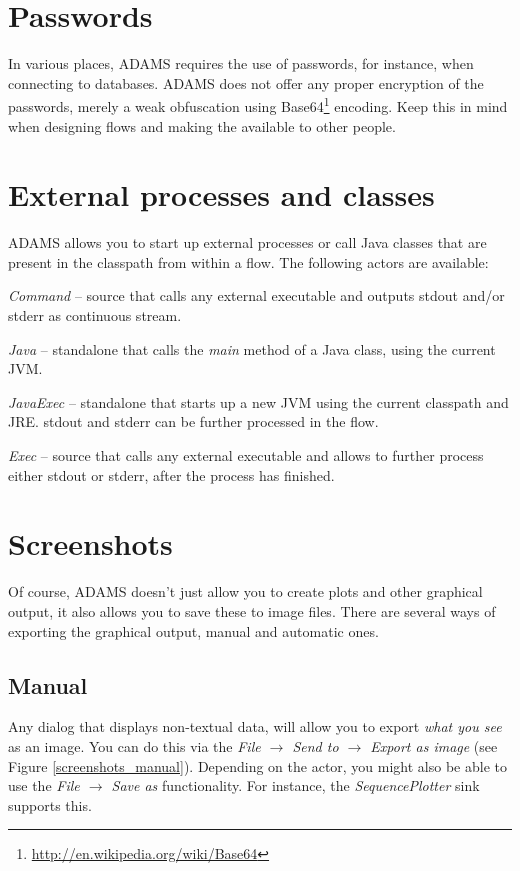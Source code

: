 \clearpage
\section{Passwords}
In various places, ADAMS requires the use of passwords, for instance, when
connecting to databases. ADAMS does not offer any proper encryption of the
passwords, merely a weak obfuscation using
Base64\footnote{\url{http://en.wikipedia.org/wiki/Base64}{}} encoding. Keep
this in mind when designing flows and making the available to other people.


\clearpage
\section{External processes and classes}
ADAMS allows you to start up external processes or call Java classes that
are present in the classpath from within a flow. The following actors are
available:
\begin{tight_itemize}
	\item \textit{Command} -- source that calls any external executable and
	outputs stdout and/or stderr as continuous stream.
	\item \textit{Java} -- standalone that calls the \textit{main} method of a
	Java class, using the current JVM.
	\item \textit{JavaExec} -- standalone that starts up a new JVM using
	the current classpath and JRE. stdout and stderr can be further processed
	in the flow.
	\item \textit{Exec} -- source that calls any external executable and allows
	to further process either stdout or stderr, after the process has finished.
\end{tight_itemize}


\clearpage
\section{Screenshots}
\label{screenshots}
Of course, ADAMS doesn't just allow you to create plots and other graphical
output, it also allows you to save these to image files. There are several
ways of exporting the graphical output, manual and automatic ones.

\subsection{Manual}
Any dialog that displays non-textual data, will allow you to export
\textit{what you see} as an image. You can do this via the
\textit{File $\rightarrow$ Send to $\rightarrow$ Export as image} (see Figure
\ref{screenshots_manual}). Depending on the actor, you might also be able to
use the \textit{File $\rightarrow$ Save as} functionality. For instance,
the \textit{SequencePlotter} sink supports this.

